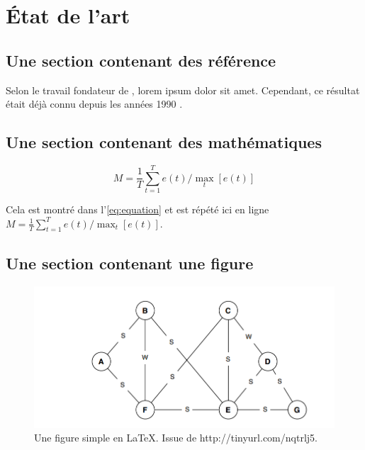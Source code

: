 \chapter{État de l'art}

\section{Une section contenant des référence}

Selon le travail fondateur de \cite{Reference1}, lorem ipsum dolor sit amet.  
Cependant, ce résultat était déjà connu depuis les années 1990 \cite{Reference2,Reference3}.  


\section{Une section contenant des mathématiques}

\lipsum  %
 
\begin{equation}
M = \frac{1}{T}\sum_{t=1}^{T} e(t) / \max_{t}[e(t)]
\label{eq:equation}
\end{equation}

\lipsum  %

Cela est montré dans l'\autoref{eq:equation} et est répété ici en ligne $M = \frac{1}{T}\sum_{t=1}^{T} e(t) / \max_{t}[e(t)]$.


\section{Une section contenant une figure}

\lipsum  %

\begin{figure}[ht]
\includegraphics[width=15cm]{figures/figure1.png}
\caption{Une figure simple en \LaTeX. Issue de http://tinyurl.com/nqtrlj5.}
\label{fig:graph}
\end{figure}


